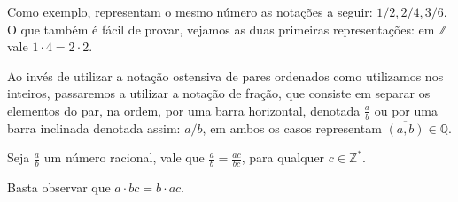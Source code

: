 \documentclass[../main.tex]{subfiles}
\begin{document}
Como exemplo, representam o mesmo número as notações a seguir: $1/2, 2/4, 3/6$. O que também é fácil de provar, vejamos as duas primeiras representações: em $\mathbb{Z}$ vale $1 \cdot 4 = 2 \cdot 2$.

\begin{obs}
    Ao invés de utilizar a notação ostensiva de pares ordenados como utilizamos nos inteiros, passaremos a utilizar a notação de fração, que consiste em separar os elementos do par, na ordem, por uma barra horizontal, denotada $\frac{a}{b}$ ou por uma barra inclinada denotada assim: $a/b$, em ambos os casos representam $\overline{\left( a,b \right)} \in \mathbb{Q}$. 
\end{obs}

\begin{prop}
    Seja $\frac{a}{b}$ um número racional, vale que $ \frac{a}{b} = \frac{ac}{bc}$, para qualquer $c \in \mathbb{Z}^*$.
\end{prop}
\begin{dem}
    Basta observar que $a \cdot bc = b \cdot ac$.
\end{dem}
\end{document}
